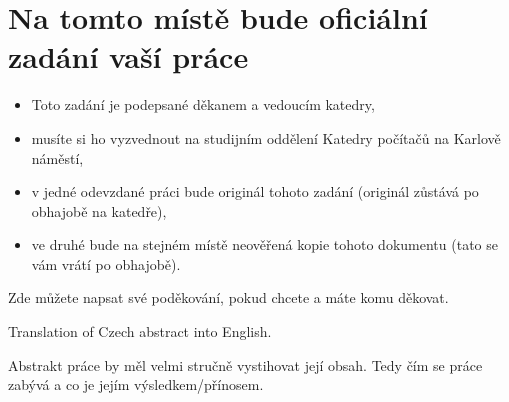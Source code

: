 \documentclass[11pt,twoside,a4paper]{book}
\begin{document}
\translate                %

{
 \cleardoublepage \thispagestyle{empty}
\chapter*{Na tomto místě bude oficiální zadání vaší práce}
\begin{itemize}
\item Toto zadání je podepsané děkanem a vedoucím katedry,
\item musíte si ho vyzvednout na studijním oddělení Katedry počítačů na Karlově náměstí,
\item v jedné odevzdané práci bude originál tohoto zadání (originál zůstává po obhajobě na katedře),
\item ve druhé bude na stejném místě neověřená kopie tohoto dokumentu (tato se vám vrátí po obhajobě).
\end{itemize}
\newpage
}

\coverpagestarts


\acknowledgements
\noindent
Zde můžete napsat své poděkování, pokud chcete a máte komu děkovat.






\abstractpage

Translation of Czech abstract into English.


\baselineskip

\noindent
Abstrakt práce by měl velmi stručně vystihovat její obsah. Tedy čím se práce zabývá a co je jejím výsledkem/přínosem.
\end{document}
